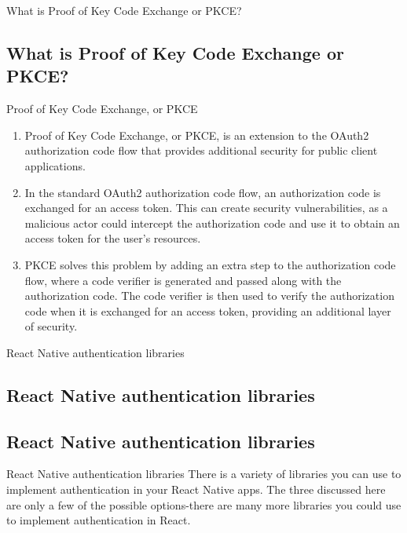 \documentclass[10pt]{beamer}
\begin{document}
\begin{frame}{What is Proof of Key Code Exchange or PKCE?}
\subsection{What is Proof of Key Code Exchange or PKCE?}
\begin{block}{Proof of Key Code Exchange, or PKCE}
\begin{enumerate}
\item[\ding{230}]Proof of Key Code Exchange, or PKCE, is an extension to the OAuth2 authorization code flow that provides additional security for public client applications.
\item[\ding{230}] In the standard OAuth2 authorization code flow, an authorization code is exchanged for an access token. This can create security vulnerabilities, as a malicious actor could intercept the authorization code and use it to obtain an access token for the user's resources. 
\item[\ding{230}] PKCE solves this problem by adding an extra step to the authorization code flow, where a code verifier is generated and passed along with the authorization code. The code verifier is then used to verify the authorization code when it is exchanged for an access token, providing an additional layer of security.


\end{enumerate}

\end{block}

\end{frame}

\begin{frame}{React Native authentication libraries }
\subsection{React Native authentication libraries}
\subsection{React Native authentication libraries}
\begin{block}{React Native authentication libraries}
There is a variety of libraries you can use to implement authentication in your React Native apps. The three discussed here are only a few of the possible options-there are many more libraries you could use to implement authentication in React.
\end{block}

\end{frame}
\end{document}
